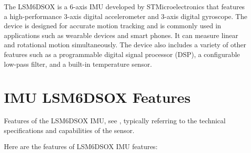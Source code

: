 The LSM6DSOX is a 6-axis IMU developed by STMicroelectronics that features a high-performance 3-axis digital accelerometer and 3-axis digital gyroscope. The device is designed for accurate motion tracking and is commonly used in applications such as wearable devices and smart phones. It can measure linear and rotational motion simultaneously.\cite{STMicroelectronics:2018} The device also includes a variety of other features such as a programmable digital signal processor (DSP), a configurable low-pass filter, and a built-in temperature sensor.

\bigskip

\section{IMU LSM6DSOX Features}

Features of the LSM6DSOX IMU, see \cite{STMicroelectronics:2018}, typically referring to the technical specifications and capabilities of the sensor.

\bigskip

 Here are the features of LSM6DSOX IMU features:

